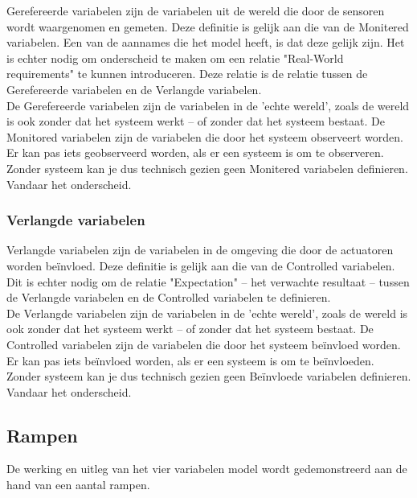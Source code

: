 \documentclass{article}
\begin{document}
			Gerefereerde variabelen zijn de variabelen uit de wereld die door de sensoren wordt waargenomen en gemeten. Deze definitie is gelijk aan die van de Monitered variabelen. Een van de aannames die het model heeft, is dat deze gelijk zijn. Het is echter nodig om onderscheid te maken om een relatie "Real-World requirements" te kunnen introduceren. Deze relatie is de relatie tussen de Gerefereerde variabelen en de Verlangde variabelen. \\
			De Gerefereerde variabelen zijn de variabelen in de 'echte wereld', zoals de wereld is ook zonder dat het systeem werkt -- of zonder dat het systeem bestaat. De Monitored variabelen zijn de variabelen die door het systeem observeert worden. Er kan pas iets geobserveerd worden, als er een systeem is om te observeren. Zonder systeem kan je dus technisch gezien geen Monitered variabelen definieren. Vandaar het onderscheid. \par
			
			\subsubsection{Verlangde variabelen}
			
			Verlangde variabelen zijn de variabelen in de omgeving die door de actuatoren worden beïnvloed. Deze definitie is gelijk aan die van de Controlled variabelen. Dit is echter nodig om de relatie "Expectation" -- het verwachte resultaat -- tussen de Verlangde variabelen en de Controlled variabelen te definieren. \\
			De Verlangde variabelen zijn de variabelen in de 'echte wereld', zoals de wereld is ook zonder dat het systeem werkt -- of zonder dat het systeem bestaat. De Controlled variabelen zijn de variabelen die door het systeem beïnvloed worden. Er kan pas iets beïnvloed worden, als er een systeem is om te beïnvloeden. Zonder systeem kan je dus technisch gezien geen Beïnvloede variabelen definieren. Vandaar het onderscheid. \cite{icsoft-pt16} \par
		
		\subsection{Rampen}
		
		De werking en uitleg van het vier variabelen model wordt gedemonstreerd aan de hand van een aantal rampen. \par
		
\end{document}
